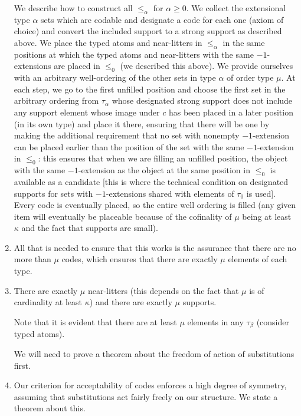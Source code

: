 \documentclass[12pt]{article}
\begin{document}
\begin{enumerate}
We describe how to construct all $\leq_\alpha$ for $\alpha\geq 0$.  We collect the extensional type $\alpha$ sets which are codable and designate a code for each one (axiom of choice) and convert the included support to a strong support as described above. We place the typed atoms and near-litters  in $\leq_\alpha$ in the same positions at which the typed atoms and near-litters with the same $-1$-extensions are placed in
$\leq_0$ (we described this above).  We provide ourselves with an arbitrary well-ordering of the other sets in type $\alpha$ of order type $\mu$.  At each step, we go to the first unfilled position and choose the first set in the arbitrary ordering from $\tau_\alpha$ whose designated strong support does not include any support element whose image under $c$ has been placed in a later position (in its own type) and place it there, ensuring that there will be one by making the additional requirement that no set with nonempty $-1$-extension can be placed earlier than the position of the set with the same $-1$-extension  in $\leq_0$:  this ensures that when we are filling an unfilled position, the object with the same $-1$-extension as the object at the same position in $\leq_0$ is available as a candidate [this is where the technical condition on designated supports for sets with $-1$-extensions shared with elements of $\tau_0$ is used].   Every code is eventually placed, so the entire well ordering is filled (any given item will eventually be placeable because of the cofinality of $\mu$ being at least $\kappa$ and the fact that supports are small).

\item All that is needed to ensure that this works is the assurance that there are no more than $\mu$ codes, which ensures that there are exactly $\mu$ elements of each type.

\item  There are exactly $\mu$ near-litters (this depends on the fact that $\mu$ is of cardinality at least $\kappa$) and there are exactly $\mu$ supports.

Note that it is evident that there are at least $\mu$ elements in any $\tau_\beta$ (consider typed atoms).

We will need to prove a theorem about the freedom of action of substitutions first.

\item Our criterion for acceptability of codes enforces a high degree of symmetry, assuming that substitutions act fairly freely on our structure.  We state a theorem about this.


\end{enumerate}
\end{document}
